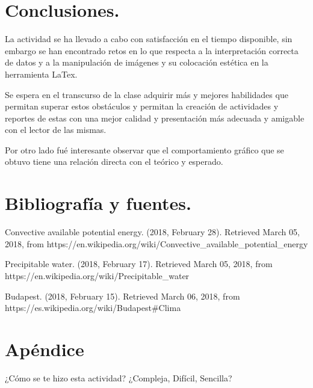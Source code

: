 \documentclass{article} %
\begin{document}
\section{Conclusiones.}

La actividad se ha llevado a cabo con satisfacción en el tiempo disponible, sin embargo se han encontrado retos en lo que respecta a la interpretación correcta de datos y a la manipulación de imágenes y su colocación estética en la herramienta LaTex.
	
\vspace{0.5 cm}

Se espera en el transcurso de la clase adquirir más y  mejores habilidades que permitan superar estos obstáculos y permitan la creación de actividades y reportes de estas con una mejor calidad y presentación más adecuada y amigable con el lector de las mismas. 

\vspace{0.5 cm}

Por otro lado fué interesante observar que el comportamiento gráfico que se obtuvo tiene una relación directa con el teórico y esperado. 


\section{Bibliografía y fuentes.}

Convective available potential energy. (2018, February 28). Retrieved March 05, 2018, from https://en.wikipedia.org/wiki/Convective\_available\_potential\_energy 	
   
\vspace{0.5 cm}

Precipitable water. (2018, February 17). Retrieved March 05, 2018, from https://en.wikipedia.org/wiki/Precipitable\_water 

\vspace{0.5 cm}

Budapest. (2018, February 15). Retrieved March 06, 2018, from https://es.wikipedia.org/wiki/Budapest\#Clima


\section*{Apéndice}

\hspace{0.45 cm} ¿Cómo se te hizo esta actividad? ¿Compleja, Difícil, Sencilla?

\vspace{0.5 cm}
\end{document}
